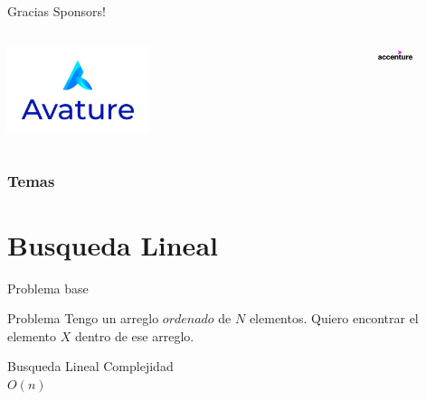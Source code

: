\documentclass{beamer}
\begin{document}
\begin{frame}{Gracias Sponsors!}
\begin{columns}[t]
\begin{minipage}{0.5\textwidth}
            \centering
            \includegraphics[width=0.4\textwidth,keepaspectratio]{logos/avature.jpg}
        \end{minipage}%
        \begin{minipage}{0.5\textwidth}
            \centering
            \includegraphics[width=0.4\textwidth,keepaspectratio]{logos/Acc_Logo_Black_Purple_RGB.png}
        \end{minipage}
    \end{columns}
\end{frame}


\begin{frame}
\frametitle{Temas}
\tableofcontents
\end{frame}


\section{Busqueda Lineal}
\begin{frame}{Problema base}
    \begin{block}{Problema}
        Tengo un arreglo $ordenado$ de $N$ elementos. 
        Quiero encontrar el elemento $X$ dentro de ese arreglo.
    \end{block}
\end{frame}
\begin{frame}{Busqueda Lineal}
    \busquedaLineal
    \centering
    Complejidad\\
    \pause
    $O(n)$
\end{frame}
\end{document}
